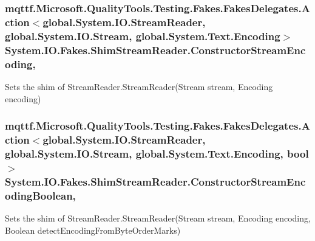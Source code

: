 \hypertarget{class_system_1_1_i_o_1_1_fakes_1_1_shim_stream_reader_a913bf2fa335f28d32c1b3d3026598281}{
\subsubsection[{Constructor\-Stream\-Encoding}]{\setlength{\rightskip}{0pt plus 5cm}mqttf.\-Microsoft.\-Quality\-Tools.\-Testing.\-Fakes.\-Fakes\-Delegates.\-Action$<$global.\-System.\-I\-O.\-Stream\-Reader, global.\-System.\-I\-O.\-Stream, global.\-System.\-Text.\-Encoding$>$ System.\-I\-O.\-Fakes.\-Shim\-Stream\-Reader.\-Constructor\-Stream\-Encoding\hspace{0.3cm}{\ttfamily [static]}, {\ttfamily [set]}}}\label{class_system_1_1_i_o_1_1_fakes_1_1_shim_stream_reader_a913bf2fa335f28d32c1b3d3026598281}


Sets the shim of Stream\-Reader.\-Stream\-Reader(\-Stream stream, Encoding encoding)

\hypertarget{class_system_1_1_i_o_1_1_fakes_1_1_shim_stream_reader_a84bf251d745868706ef71b098b92f5e6}{
\subsubsection[{Constructor\-Stream\-Encoding\-Boolean}]{\setlength{\rightskip}{0pt plus 5cm}mqttf.\-Microsoft.\-Quality\-Tools.\-Testing.\-Fakes.\-Fakes\-Delegates.\-Action$<$global.\-System.\-I\-O.\-Stream\-Reader, global.\-System.\-I\-O.\-Stream, global.\-System.\-Text.\-Encoding, bool$>$ System.\-I\-O.\-Fakes.\-Shim\-Stream\-Reader.\-Constructor\-Stream\-Encoding\-Boolean\hspace{0.3cm}{\ttfamily [static]}, {\ttfamily [set]}}}\label{class_system_1_1_i_o_1_1_fakes_1_1_shim_stream_reader_a84bf251d745868706ef71b098b92f5e6}


Sets the shim of Stream\-Reader.\-Stream\-Reader(\-Stream stream, Encoding encoding, Boolean detect\-Encoding\-From\-Byte\-Order\-Marks)

